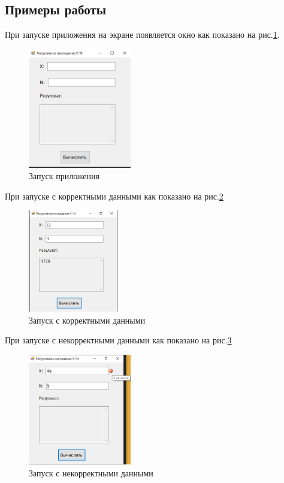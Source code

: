 \subsection{Примеры работы}

При запуске приложения на экране появляется окно как показано на рис.\ref{fig:StartForm3}.

\begin{figure}[!h]
    \centering
    \includegraphics[width = 0.4\textwidth]{images/Task3/Start.png}
    \caption{Запуск приложения}
    \label{fig:StartForm3}
\end{figure}

При запуске с корректными данными как показано на рис.\ref{fig:WorkForm3}

\begin{figure}[!h]
    \centering
    \includegraphics[width = 0.35\textwidth]{images/Task3/Work1.png}
    \caption{Запуск с корректными данными}
    \label{fig:WorkForm3}
\end{figure}

При запуске с некорректными данными как показано на рис.\ref{fig:BadInputNotIntForm3}

\begin{figure}[!h]
    \centering
    \includegraphics[width = 0.4\textwidth]{images/Task3/BadInputNotInt1.png}
    \caption{Запуск с некорректными данными}
    \label{fig:BadInputNotIntForm3}
\end{figure}

